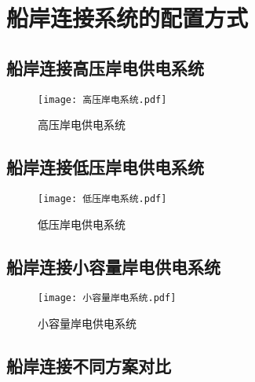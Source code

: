 \section{船岸连接系统的配置方式}

\subsection{船岸连接高压岸电供电系统}

\zhlipsum[1]

\begin{figure}[!htp]
	\centering
	\texttt{[image: 高压岸电系统.pdf]}
	\caption{高压岸电供电系统}
	\label{fig:高压岸电供电系统}
\end{figure}



\subsection{船岸连接低压岸电供电系统}


\zhlipsum[2]

\begin{figure}[!htp]
	\centering
	\texttt{[image: 低压岸电系统.pdf]}
	\caption{低压岸电供电系统}
	\label{fig:低压岸电供电系统}
\end{figure}



\subsection{船岸连接小容量岸电供电系统}

\zhlipsum[3]

\begin{figure}[!htp]
	\centering
	\texttt{[image: 小容量岸电系统.pdf]}
	\caption{小容量岸电供电系统}
	\label{fig:小容量岸电供电系统}
\end{figure}



\subsection{船岸连接不同方案对比}


